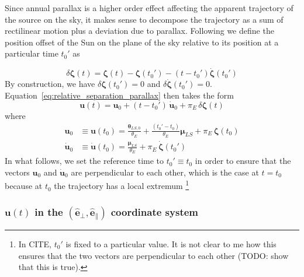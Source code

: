 \documentclass[12pt,dvipsnames]{report}
\begin{document}
Since annual parallax is a higher order effect affecting the apparent
trajectory of the source on the sky, it makes sense to decompose the trajectory
as a sum of rectilinear motion plus a deviation due to parallax. Following
\citet{2004ApJ...606..319G} we define the position offset of the Sun on the
plane of the sky relative to its position at a particular time $t_0'$ as

\begin{equation}
    \delta\boldsymbol \zeta (t)=\boldsymbol \zeta (t)-\boldsymbol \zeta (t_0')-(t-t_0')
    \boldsymbol{\dot \zeta} (t_0')
\end{equation}
By construction, we have $\delta\boldsymbol \zeta (t_0')=0$ and
$\delta\dot{\boldsymbol \zeta} (t_0')=0$.
Equation~\ref{eq:relative_separation_parallax} then takes the form
\begin{equation}
    \boldsymbol{u}(t)=\mathbf{u}_0 + (t-t_0')\,\dot{\mathbf{u}}_0 +
    \pi_E\,\delta\boldsymbol \zeta(t)
    \label{eq:relative_separation_parallax_decomposed}
\end{equation}
where
\begin{align}
    \mathbf{u}_0       & \equiv \mathbf{u}(t_0) =\frac{\boldsymbol\theta_{LS, 0}}{\theta_E}
    + \frac{(t_0'-t_0)}{\theta_E}\boldsymbol\mu_{LS}+
    \pi_E\,\boldsymbol \zeta(t_0)                                                           \\
    \dot{\mathbf{u}}_0 & \equiv\dot{\mathbf{u}}(t_0)=
    \frac{\boldsymbol\mu_{LS}}{\theta_E}  + \pi_E\,\dot{\boldsymbol \zeta}
    (t_0')
\end{align}
In what follows, we set the reference time to $t_0'\equiv t_0$ in order to ensure that
the vectors $\mathbf{u}_0$ and $\dot{\mathbf{u}}_0$ are perpendicular to each other,
which is the case at $t=t_0$ because at $t_0$ the trajectory has a local extremum
\footnote{In CITE, $t_0'$ is fixed to a particular value. It is not clear
    to me how this ensures that the two vectors are perpendicular to each other
    (TODO: show that this is true).}

\subsubsection{$\mathbf{u}(t)$ in the $(\mathbf{\hat e}_\bot,
        \mathbf{\hat e}_\parallel)$ coordinate system}%
\end{document}
